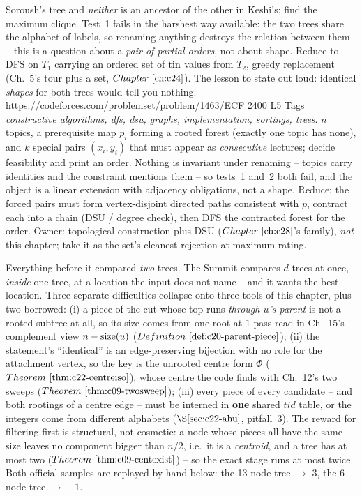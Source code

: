 \begin{mixedset}
{     Soroush's tree and \emph{neither} is an ancestor of the other in Keshi's; find the
     maximum clique. Test~1 fails in the harshest way available: the two trees share the
     alphabet of labels, so renaming anything destroys the relation between them -- this is
     a question about a \emph{pair of partial orders}, not about shape. Reduce to DFS on
     \(T_1\) carrying an ordered set of \(\operatorname{tin}\) values from \(T_2\), greedy replacement
     (Ch.~5's tour plus a set, \(\chref{c24}\)). The lesson to state out loud: identical
     \emph{shapes} for both trees would tell you nothing.}
    {https://codeforces.com/problemset/problem/1463/E}{CF 2400 L5}
    {Tags \emph{constructive algorithms, dfs, dsu, graphs, implementation, sortings, trees}.
     \(n\) topics, a prerequisite map \(p_i\) forming a rooted forest (exactly one topic
     has none), and \(k\) special pairs \((x_i,y_i)\) that must appear as
     \emph{consecutive} lectures; decide feasibility and print an order. Nothing is
     invariant under renaming -- topics carry identities and the constraint mentions them
     -- so tests~1 and~2 both fail, and the object is a linear extension with adjacency
     obligations, not a shape. Reduce: the forced pairs must form vertex-disjoint directed
     paths consistent with \(p\), contract each into a chain (DSU / degree check), then DFS
     the contracted forest for the order. Owner: topological construction plus DSU
     (\(\chref{c28}\)'s family), \emph{not} this chapter; take it as the set's cleanest
     rejection at maximum rating.}
\end{mixedset}


\begin{notebox}
Everything before it compared \emph{two} trees. The Summit compares \(d\) trees at once,
\emph{inside} one tree, at a location the input does not name -- and it wants the best
location. Three separate difficulties collapse onto three tools of this chapter, plus two
borrowed: (i) a piece of the cut whose top runs \emph{through \(u\)'s parent} is not a
rooted subtree at all, so its size comes from one root-at-\(1\) pass read in Ch.~15's
complement view \(n-\operatorname{size}(u)\) (\(\defref{c20-parent-piece}\)); (ii) the statement's
``identical'' is an edge-preserving bijection with no role for the attachment vertex, so the
key is the unrooted centre form \(\Phi\) (\(\thmref{c22-centreiso}\)), whose centre the code
finds with Ch.~12's two sweeps (\(\thmref{c09-twosweep}\)); (iii) every piece of every
candidate -- and both rootings of a centre edge -- must be interned in \textbf{one} shared
\(\mathit{tid}\) table, or the integers come from different alphabets
(\(\secref{c22-ahu}\), pitfall~3). The reward for filtering first is structural, not
cosmetic: a node whose pieces all have the same size leaves no component bigger than
\(n/2\), i.e.\ it is a \emph{centroid}, and a tree has at most two
(\(\thmref{c09-centexist}\)) -- so the exact stage runs at most twice. Both official
samples are replayed by hand below: the 13-node tree \(\to\) \(3\), the 6-node tree
\(\to\) \(-1\).
\end{notebox}

